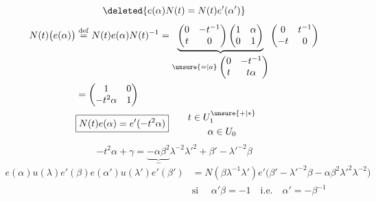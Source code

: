 \[
\deleted{e(\alpha)N(t)=N(t)e'(\alpha')}
\]
\[
\begin{aligned}
 N(t)\bigl(e(\alpha)\bigr)&\overset{\mathrm{def}}=N(t)e(\alpha)N(t)^{-1}
 =\underbrace{\begin{pmatrix}0&-t^{-1}\\t&0\end{pmatrix}\begin{pmatrix}1&\alpha\\0&1\end{pmatrix}}_{\unsure{=|a}\;\begin{pmatrix}0&-t^{-1}\\t&t\alpha\end{pmatrix}}\begin{pmatrix}0&t^{-1}\\-t&0\end{pmatrix}\\
 &=\begin{pmatrix}1&0\\-t^2\alpha&1\end{pmatrix}\\
 &\boxed{N(t)e(\alpha)=e'(-t^2\alpha)}\qquad\begin{gathered}t\in U_1^{\unsure{+|\ast}}\\\alpha\in U_0\end{gathered}
\end{aligned}
\]
\[
-t^2\alpha+\gamma=\underbrace{-\alpha\beta^2}_{-}\lambda^{-2}{\lambda'}^2+\beta'-{\lambda'}^{-2}\beta
\]
\[
\begin{aligned}
e(\alpha)u(\lambda)e'(\beta)e(\alpha')u(\lambda')e'(\beta')&=\boxed{N(\beta\lambda^{-1}\lambda')e'\bigl(\beta'-{\lambda'}^{-2}\beta-\alpha\beta^2{\lambda'}^2\lambda^{-2}\bigr)}\\
&\text{si }\quad \alpha'\beta=-1\quad\text{i.e.}\quad \alpha'=-\beta^{-1}
\end{aligned}
\]
